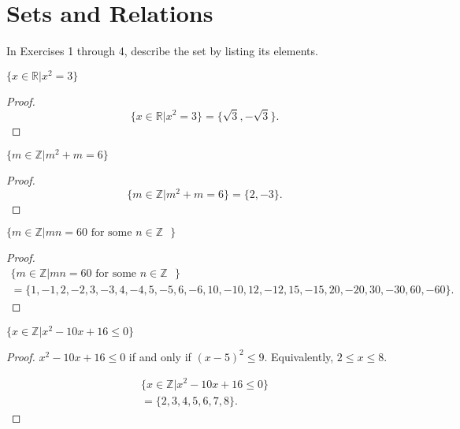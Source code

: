 \newpage
\section{Sets and Relations}

In Exercises 1 through 4, describe the set by listing its elements.

\begin{exercise}
    $\{ x\in\mathbb{R} \vert x^{2} = 3 \}$
\end{exercise}

\begin{proof}
    \[
        \{ x\in\mathbb{R} \vert x^{2} = 3 \} = \{ \sqrt{3}, -\sqrt{3} \}.
    \]
\end{proof}

\newpage
\begin{exercise}
    $\{ m\in\mathbb{Z} \vert m^{2} + m = 6 \}$
\end{exercise}

\begin{proof}
    \[
        \{ m\in\mathbb{Z} \vert m^{2} + m = 6 \} = \{ 2, -3 \}.
    \]
\end{proof}

\newpage
\begin{exercise}
    $\{ m\in\mathbb{Z} \vert mn = 60 \text{ for some $n\in\mathbb{Z}$ } \}$
\end{exercise}

\begin{proof}
    \begin{multline*}
        \{ m\in\mathbb{Z} \vert mn = 60 \text{\ for some $n\in\mathbb{Z}$ } \} \\
        = \{ 1, -1, 2, -2, 3, -3, 4, -4, 5, -5, 6, -6, 10, -10, 12, -12, 15, -15, 20, -20, 30, -30, 60, -60 \}.
    \end{multline*}
\end{proof}

\newpage
\begin{exercise}
    $\{ x\in\mathbb{Z} \vert x^{2} - 10x + 16 \le 0 \}$
\end{exercise}

\begin{proof}
    $x^{2} - 10x + 16 \le 0$ if and only if ${(x - 5)}^{2} \le 9$. Equivalently, $2 \le x \le 8$.

    \begin{multline*}
        \{ x\in\mathbb{Z} \vert x^{2} - 10x + 16 \le 0 \} \\
        = \{ 2, 3, 4, 5, 6, 7, 8 \}.
    \end{multline*}
\end{proof}

